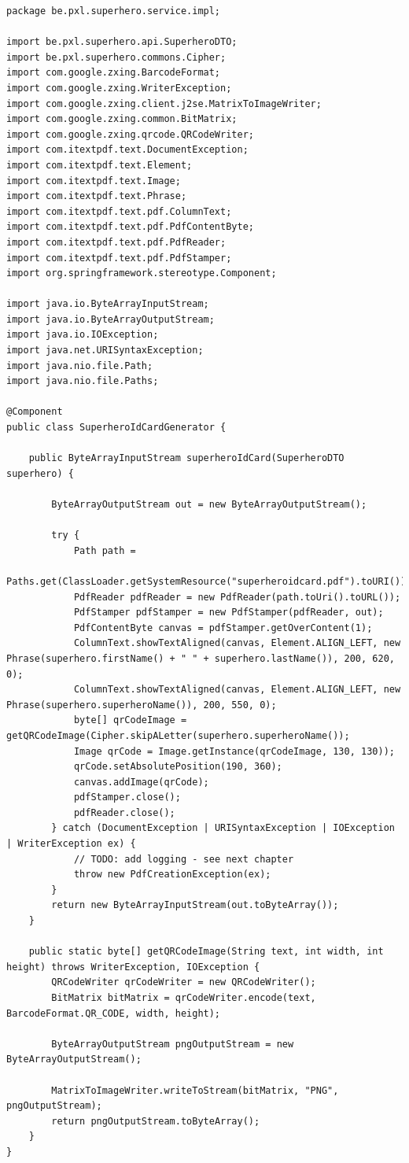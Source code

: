 \begin{lstlisting}
package be.pxl.superhero.service.impl;

import be.pxl.superhero.api.SuperheroDTO;
import be.pxl.superhero.commons.Cipher;
import com.google.zxing.BarcodeFormat;
import com.google.zxing.WriterException;
import com.google.zxing.client.j2se.MatrixToImageWriter;
import com.google.zxing.common.BitMatrix;
import com.google.zxing.qrcode.QRCodeWriter;
import com.itextpdf.text.DocumentException;
import com.itextpdf.text.Element;
import com.itextpdf.text.Image;
import com.itextpdf.text.Phrase;
import com.itextpdf.text.pdf.ColumnText;
import com.itextpdf.text.pdf.PdfContentByte;
import com.itextpdf.text.pdf.PdfReader;
import com.itextpdf.text.pdf.PdfStamper;
import org.springframework.stereotype.Component;

import java.io.ByteArrayInputStream;
import java.io.ByteArrayOutputStream;
import java.io.IOException;
import java.net.URISyntaxException;
import java.nio.file.Path;
import java.nio.file.Paths;

@Component
public class SuperheroIdCardGenerator {

    public ByteArrayInputStream superheroIdCard(SuperheroDTO superhero) {

        ByteArrayOutputStream out = new ByteArrayOutputStream();

        try {
            Path path = 
                Paths.get(ClassLoader.getSystemResource("superheroidcard.pdf").toURI());
            PdfReader pdfReader = new PdfReader(path.toUri().toURL());
            PdfStamper pdfStamper = new PdfStamper(pdfReader, out);
            PdfContentByte canvas = pdfStamper.getOverContent(1);
            ColumnText.showTextAligned(canvas, Element.ALIGN_LEFT, new Phrase(superhero.firstName() + " " + superhero.lastName()), 200, 620, 0);
            ColumnText.showTextAligned(canvas, Element.ALIGN_LEFT, new Phrase(superhero.superheroName()), 200, 550, 0);
            byte[] qrCodeImage = getQRCodeImage(Cipher.skipALetter(superhero.superheroName());
            Image qrCode = Image.getInstance(qrCodeImage, 130, 130));
            qrCode.setAbsolutePosition(190, 360);
            canvas.addImage(qrCode);
            pdfStamper.close();
            pdfReader.close();
        } catch (DocumentException | URISyntaxException | IOException | WriterException ex) {
            // TODO: add logging - see next chapter
            throw new PdfCreationException(ex);
        }
        return new ByteArrayInputStream(out.toByteArray());
    }

    public static byte[] getQRCodeImage(String text, int width, int height) throws WriterException, IOException {
        QRCodeWriter qrCodeWriter = new QRCodeWriter();
        BitMatrix bitMatrix = qrCodeWriter.encode(text, BarcodeFormat.QR_CODE, width, height);

        ByteArrayOutputStream pngOutputStream = new ByteArrayOutputStream();

        MatrixToImageWriter.writeToStream(bitMatrix, "PNG", pngOutputStream);
        return pngOutputStream.toByteArray();
    }
}
\end{lstlisting}

